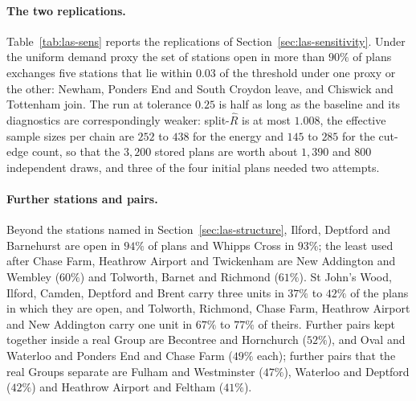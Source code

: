 \paragraph{The two replications.}
Table~\ref{tab:las-sens} reports the replications of Section~\ref{sec:las-sensitivity}. Under the uniform demand proxy the set of stations open in more than $90\%$ of plans exchanges five stations that lie within $0.03$ of the threshold under one proxy or the other: Newham, Ponders End and South Croydon leave, and Chiswick and Tottenham join. The run at tolerance $0.25$ is half as long as the baseline and its diagnostics are correspondingly weaker: split-$\hat R$ is at most $1.008$, the effective sample sizes per chain are $252$ to $438$ for the energy and $145$ to $285$ for the cut-edge count, so that the $3{,}200$ stored plans are worth about $1{,}390$ and $800$ independent draws, and three of the four initial plans needed two attempts.

\paragraph{Further stations and pairs.}
Beyond the stations named in Section~\ref{sec:las-structure}, Ilford, Deptford and Barnehurst are open in $94\%$ of plans and Whipps Cross in $93\%$; the least used after Chase Farm, Heathrow Airport and Twickenham are New Addington and Wembley ($60\%$) and Tolworth, Barnet and Richmond ($61\%$). St John's Wood, Ilford, Camden, Deptford and Brent carry three units in $37\%$ to $42\%$ of the plans in which they are open, and Tolworth, Richmond, Chase Farm, Heathrow Airport and New Addington carry one unit in $67\%$ to $77\%$ of theirs. Further pairs kept together inside a real Group are Becontree and Hornchurch ($52\%$), and Oval and Waterloo and Ponders End and Chase Farm ($49\%$ each); further pairs that the real Groups separate are Fulham and Westminster ($47\%$), Waterloo and Deptford ($42\%$) and Heathrow Airport and Feltham ($41\%$).
